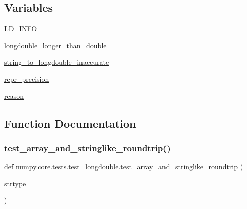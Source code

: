 \subsection*{Variables}
\begin{DoxyCompactItemize}
\item 
\hyperlink{namespacenumpy_1_1core_1_1tests_1_1test__longdouble_ac1eb732208e2a3474205c0c1beb839d9}{L\+D\+\_\+\+I\+N\+FO}
\item 
\hyperlink{namespacenumpy_1_1core_1_1tests_1_1test__longdouble_ae8ba951dc3b45a76869c4b9569588449}{longdouble\+\_\+longer\+\_\+than\+\_\+double}
\item 
\hyperlink{namespacenumpy_1_1core_1_1tests_1_1test__longdouble_ad4c8b8261802296398865c6a2df4382f}{string\+\_\+to\+\_\+longdouble\+\_\+inaccurate}
\item 
\hyperlink{namespacenumpy_1_1core_1_1tests_1_1test__longdouble_a972161aa48ddc6b2ffd78f427fcee6ee}{repr\+\_\+precision}
\item 
\hyperlink{namespacenumpy_1_1core_1_1tests_1_1test__longdouble_a629db712c3ccf5b8dca6402eec8b69d2}{reason}
\end{DoxyCompactItemize}


\subsection{Function Documentation}
\mbox{\label{namespacenumpy_1_1core_1_1tests_1_1test__longdouble_a58082952834ac1f153012cd13af6c6a7}} 
\subsubsection{\texorpdfstring{test\+\_\+array\+\_\+and\+\_\+stringlike\+\_\+roundtrip()}{test\_array\_and\_stringlike\_roundtrip()}}
{\footnotesize\ttfamily def numpy.\+core.\+tests.\+test\+\_\+longdouble.\+test\+\_\+array\+\_\+and\+\_\+stringlike\+\_\+roundtrip (\begin{DoxyParamCaption}\item[{}]{strtype }\end{DoxyParamCaption})}

